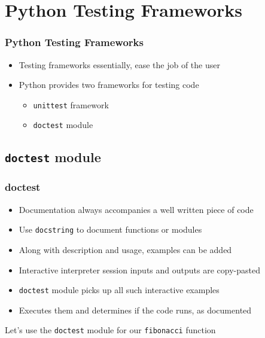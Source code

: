 \documentclass[12pt,presentation]{beamer}
\begin{document}
\section{Python Testing Frameworks}

\begin{frame}[fragile]
  \frametitle{Python Testing Frameworks}
  \begin{itemize}
  \item Testing frameworks essentially, ease the job of the user
  \item Python provides two frameworks for testing code
    \begin{itemize}
    \item \texttt{unittest} framework
    \item \texttt{doctest} module
    \end{itemize}
  \end{itemize}
\end{frame}
\subsection{\texttt{doctest} module}

\begin{frame}[fragile]
  \frametitle{doctest}
  \begin{itemize}
  \item Documentation always accompanies a well written piece of code
  \item Use \texttt{docstring} to document functions or modules
  \item Along with description and usage, examples can be added
  \item Interactive interpreter session inputs and outputs are
    copy-pasted 
  \item \texttt{doctest} module picks up all such interactive examples
  \item Executes them and determines if the code runs, as documented
  \end{itemize}
  Let's use the \texttt{doctest} module for our \texttt{fibonacci} function
\end{frame}

\end{document}
